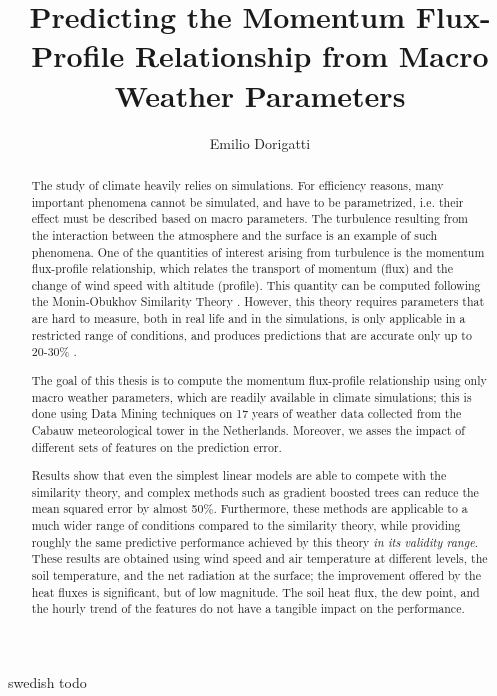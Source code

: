 \documentclass[a4paper,11pt]{kth-mag}
\title{Predicting the Momentum Flux-Profile Relationship from  Macro Weather Parameters}
\author{Emilio Dorigatti}
\begin{document}
\frontmatter
\pagestyle{empty}
\removepagenumbers
\maketitle
{}
\begin{abstract}
The study of climate heavily relies on simulations. For efficiency reasons, many important phenomena cannot be simulated, and have to be parametrized, i.e. their effect must be described based on macro parameters. The turbulence resulting from the interaction between the atmosphere and the surface is an example of such phenomena. One of the quantities of interest arising from turbulence is the momentum flux-profile relationship, which relates the transport of momentum (flux) and the change of wind speed with altitude (profile). This quantity can be computed following the Monin-Obukhov Similarity Theory \citep{mostayyyy}. However, this theory requires parameters that are hard to measure, both in real life and in the simulations, is only applicable in a restricted range of conditions, and produces predictions that are accurate only up to 20-30\% \citep{50years}.

The goal of this thesis is to compute the momentum flux-profile relationship using only macro weather parameters, which are readily available in climate simulations; this is done using Data Mining techniques on 17 years of weather data collected from the Cabauw meteorological tower in the Netherlands. Moreover, we asses the impact of different sets of features on the prediction error.

Results show that even the simplest linear models are able to compete with the similarity theory, and complex methods such as gradient boosted trees can reduce the mean squared error by almost 50\%. Furthermore, these methods are applicable to a much wider range of conditions compared to the similarity theory, while providing roughly the same predictive performance achieved by this theory \emph{in its validity range}. These results are obtained using wind speed and air temperature at different levels, the soil temperature, and the net radiation at the surface; the improvement offered by the heat fluxes is significant, but of low magnitude. The soil heat flux, the dew point, and the hourly trend of the features do not have a tangible impact on the performance.
\end{abstract}
\clearpage
\begin{foreignabstract}{swedish}
todo
\end{foreignabstract}
\clearpage
\end{document}
